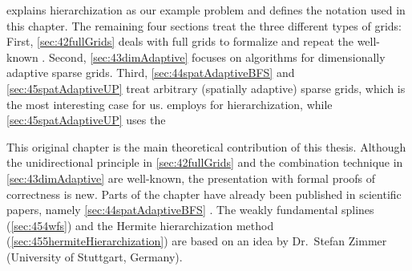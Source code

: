  explains hierarchization as our example problem
and defines the notation used in this chapter.
The remaining four sections treat the three different types of grids:
First, \cref{sec:42fullGrids} deals with full grids to formalize and repeat
the well-known \up. %
Second, \cref{sec:43dimAdaptive} focuses on algorithms for
dimensionally adaptive sparse grids.
Third, \cref{sec:44spatAdaptiveBFS} and \cref{sec:45spatAdaptiveUP}
treat arbitrary (spatially adaptive) sparse grids,
which is the most interesting case for us.
 employs \bfs for hierarchization,
while \cref{sec:45spatAdaptiveUP} uses the \up{}

This original chapter is the main theoretical contribution of this thesis.
Although the unidirectional principle in \cref{sec:42fullGrids} and
the combination technique in \cref{sec:43dimAdaptive} are well-known,
the presentation with formal proofs of correctness is new.
Parts of the chapter have already been published in scientific papers,
namely \cref{sec:44spatAdaptiveBFS} \cite{Valentin18Fundamental}.
The weakly fundamental splines (\cref{sec:454wfs}) and the
Hermite hierarchization method (\cref{sec:455hermiteHierarchization})
are based on an idea by Dr.\ Stefan Zimmer (University of Stuttgart, Germany).









\cleardoublepage
